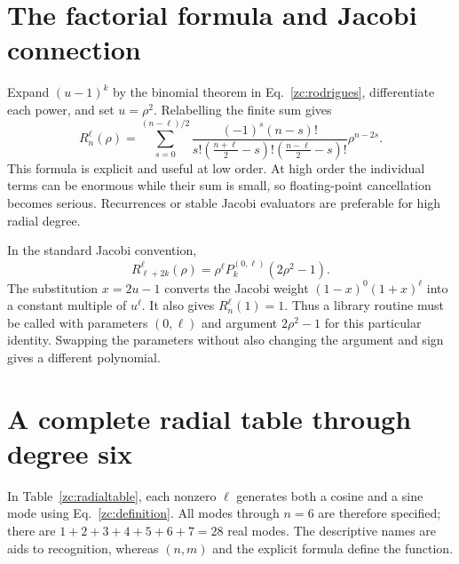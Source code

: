 \section{The factorial formula and Jacobi connection}
Expand $(u-1)^k$ by the binomial theorem in
Eq.~\eqref{zc:rodrigues}, differentiate each power, and set $u=\rho^2$.
Relabelling the finite sum gives
\begin{equation}
 \boxed{R_n^\ell(\rho)=
 \sum_{s=0}^{(n-\ell)/2}
 \frac{(-1)^s(n-s)!}
 {s!\left(\frac{n+\ell}{2}-s\right)!
      \left(\frac{n-\ell}{2}-s\right)!}\rho^{n-2s}.}
 \label{zc:factorial}
\end{equation}
This formula is explicit and useful at low order. At high order the
individual terms can be enormous while their sum is small, so
floating-point cancellation becomes serious. Recurrences or stable
Jacobi evaluators are preferable for high radial degree.

In the standard Jacobi convention,
\begin{equation}
 R_{\ell+2k}^{\ell}(\rho)
       =\rho^\ell P_k^{(0,\ell)}(2\rho^2-1).
 \label{zc:jacobi}
\end{equation}
The substitution $x=2u-1$ converts the Jacobi weight
$(1-x)^0(1+x)^\ell$ into a constant multiple of $u^\ell$.
It also gives $R_n^\ell(1)=1$. Thus a library routine must be called
with parameters $(0,\ell)$ and argument $2\rho^2-1$ for this particular
identity. Swapping the parameters without also changing the argument
and sign gives a different polynomial.

\section{A complete radial table through degree six}
In Table~\ref{zc:radialtable}, each nonzero $\ell$ generates both a cosine
and a sine mode using Eq.~\eqref{zc:definition}. All modes through $n=6$
are therefore specified; there are $1+2+3+4+5+6+7=28$ real modes.
The descriptive names are aids to recognition, whereas $(n,m)$ and
the explicit formula define the function.

